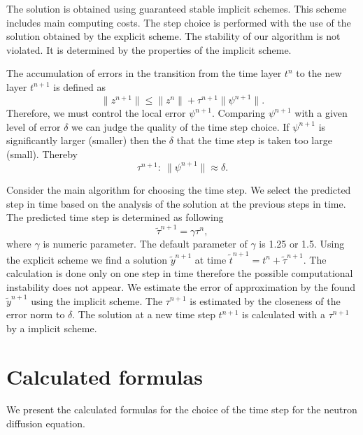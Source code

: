 \documentclass[runningheads]{llncs}
\begin{document}
The solution is obtained using guaranteed stable implicit schemes.
This scheme includes main computing costs.
The step choice is performed with the use of the solution obtained by the explicit scheme.
The stability of our algorithm is not violated. 
It is determined by the properties of the implicit scheme.

The accumulation of errors in the transition from the time layer $t^n$ to the new layer $t^{n+1}$  is defined as
\begin{equation}\label{8}
\|z^{n+1}\| \leq \|z^{n}\| + \tau^{n+1} \|\psi^{n+1}\| .
\end{equation}
Therefore, we must control the local error $\psi^{n+1}$. Comparing $\psi^{n+1}$ with a given level of error $\delta$ we can judge the quality of the time step choice. If $\psi^{n+1}$ is significantly larger (smaller) then the $\delta$ that the time step is taken too large (small). Thereby
\begin{equation}\label{9}
  \tau^{n+1}: \ \|\psi^{n+1}\| \approx \delta .
\end{equation} 

Consider the main algorithm for choosing the time step. We select the predicted step in time based on the analysis of the solution at the previous steps in time. The predicted time step is determined as following
\begin{equation}
 \widetilde{\tau}^{n+1} = \gamma \tau^n , 
\end{equation}
where $\gamma$ is numeric parameter. The default parameter of $\gamma$ is 1.25 or 1.5. Using the explicit scheme we find a solution $\widetilde{y}^{n+1}$ at time $\widetilde{t}^{n+1} = t^n + \widetilde{\tau}^{n+1}$. The calculation is done only on one step in time therefore the possible computational instability does not appear.
We estimate the error of approximation by the found $\widetilde{y}^{n+1}$ using the implicit scheme. The $\tau^{n+1}$ is estimated by the closeness of the error norm to $\delta$. The solution at a new time step $t^{n+1}$ is calculated with a $\tau^{n+1}$  by a implicit scheme.

\section{Calculated formulas}
We present the calculated formulas for the choice of the time step for the neutron diffusion equation.
\end{document}
